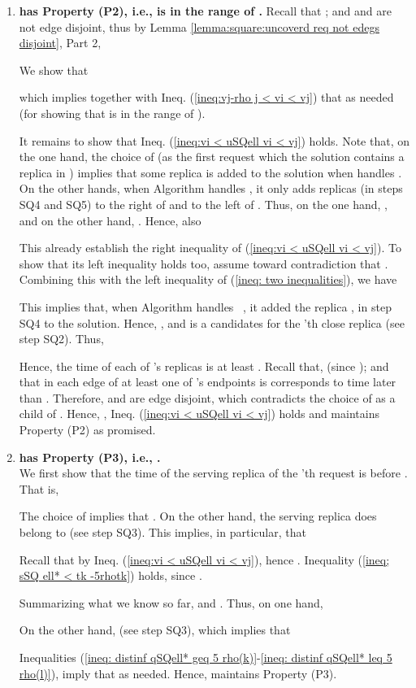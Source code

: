 \documentclass[11pt]{article}
\begin{document}
\begin{enumerate}
\item {\bf  has Property (P2), i.e.,  is in the range of .}
Recall that ; and  and  are not edge disjoint, thus by Lemma \ref{lemma:square:uncoverd req not edegs disjoint}, Part 2,

We show
that

which implies together with Ineq. (\ref{ineq:vj-rho j < vi < vj}) that
 as needed (for showing that  is in the range of ).

It remains to show that Ineq. (\ref{ineq:vi < uSQell vi < vj}) holds.
Note that, on the one hand,
the choice of  (as the first request which the solution  contains a replica in ) implies that
some replica  is added to the solution when  handles .
On the other hands, when Algorithm  handles ,
it only adds replicas (in steps SQ4 and SQ5) to the right of  and to the left of .
Thus, on the one hand, , and on the other hand, .
Hence, also




This already establish the right inequality of (\ref{ineq:vi < uSQell vi < vj}).
To show that its left inequality holds too,
assume toward contradiction that .
Combining this with the left inequality of (\ref{ineq: two inequalities}), we have

This implies that, when Algorithm  handles ~, it added the replica , in step SQ4 to the solution.
Hence, ,
and is a candidates for the 'th close replica (see step SQ2).
Thus,

Hence, the time of each of 's replicas is at least .
Recall that,  (since );
and that in each edge  of  at least one of 's endpoints is corresponds to time later  than .
Therefore,  and  are edge disjoint,
which contradicts the choice of  as a child of .
Hence, ,  Ineq. (\ref{ineq:vi < uSQell vi < vj}) holds and  maintains Property (P2) as promised.










\item {\bf  has Property (P3), i.e., .}\\


We first show that the time  of the serving replica  of the 'th request is before .
That is,

The choice of  implies that .
On the other hand, the serving replica  does belong to  (see step SQ3).
This implies, in particular, that

Recall that  by Ineq. (\ref{ineq:vi < uSQell vi < vj}),
hence .
Inequality (\ref{ineq; sSQ ell* < tk -5rhotk}) holds, since .

Summarizing what we know so far,   and .
Thus, on  one hand,

On the other hand,
 (see step SQ3),
which implies that


Inequalities (\ref{ineq: distinf qSQell* geq 5 rho(k)}-\ref{ineq: distinf qSQell* leq 5 rho(l)}), imply that  as needed.
Hence,  maintains Property (P3).


\end{enumerate}
\end{document}
